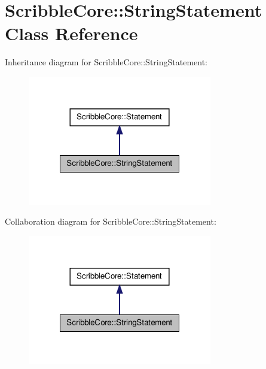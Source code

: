 \hypertarget{class_scribble_core_1_1_string_statement}{\section{Scribble\-Core\-:\-:String\-Statement Class Reference}
\label{class_scribble_core_1_1_string_statement}
}


Inheritance diagram for Scribble\-Core\-:\-:String\-Statement\-:\nopagebreak
\begin{figure}[H]
\begin{center}
\leavevmode
\includegraphics[width=228pt]{class_scribble_core_1_1_string_statement__inherit__graph}
\end{center}
\end{figure}


Collaboration diagram for Scribble\-Core\-:\-:String\-Statement\-:\nopagebreak
\begin{figure}[H]
\begin{center}
\leavevmode
\includegraphics[width=228pt]{class_scribble_core_1_1_string_statement__coll__graph}
\end{center}
\end{figure}
